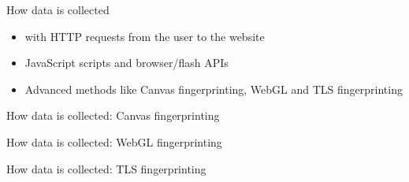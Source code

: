 \begin{frame}{How data is collected}
  \begin{itemize}
    \item with HTTP requests from the user to the website
    \item JavaScript scripts and browser/flash APIs
    \item Advanced methods like Canvas fingerprinting, WebGL and TLS fingerprinting
  \end{itemize}
\end{frame}

\begin{frame}{How data is collected: Canvas fingerprinting}
  
\end{frame}

\begin{frame}{How data is collected: WebGL fingerprinting}
  
\end{frame}

\begin{frame}{How data is collected: TLS fingerprinting}
  
\end{frame}